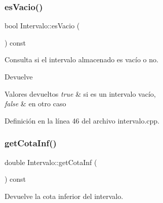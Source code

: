 \subsubsection{\texorpdfstring{esVacio()}{esVacio()}}
{\footnotesize\ttfamily bool Intervalo\+::es\+Vacio (\begin{DoxyParamCaption}{ }\end{DoxyParamCaption}) const}



Consulta si el intervalo almacenado es vacío o no. 

\begin{DoxyReturn}{Devuelve}

\end{DoxyReturn}

\begin{DoxyRetVals}{Valores devueltos}
{\em true} & si es un intervalo vacío,\\
\hline
{\em false} & en otro caso \\
\hline
\end{DoxyRetVals}


Definición en la línea 46 del archivo intervalo.\+cpp.


\begin{DoxyCode}{0}

\end{DoxyCode}
\mbox{\label{classIntervalo_aafa3f6ec78c6bd44b568e343fb22fc90}} 
\subsubsection{\texorpdfstring{getCotaInf()}{getCotaInf()}}
{\footnotesize\ttfamily double Intervalo\+::get\+Cota\+Inf (\begin{DoxyParamCaption}{ }\end{DoxyParamCaption}) const}



Devuelve la cota inferior del intervalo. 

